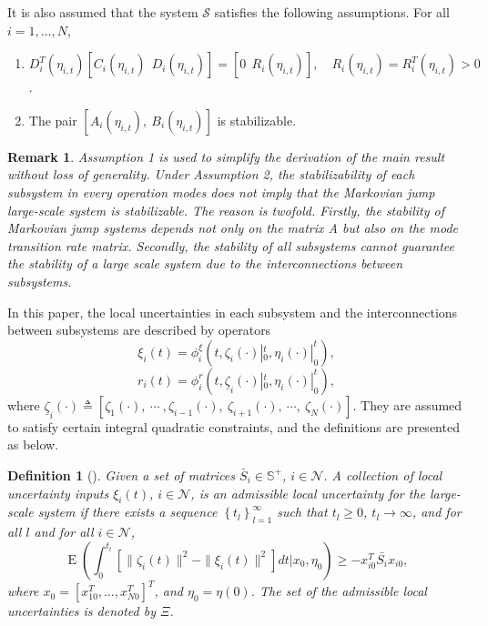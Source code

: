 \documentclass[11pt,draftcls,onecolumn]{IEEEtran}
\DeclareMathOperator{\E}{E}
\newcommand{\set}[1]{\left\{#1\right\}}
\newtheorem{definition}{Definition}
\newtheorem{remark}{Remark}
\begin{document}
It is also assumed that the system $\mathcal{S}$ satisfies the following assumptions. For all $i=1,\ldots, N$,
\begin{enumerate}
\item $D_i^T(\eta_{i,t})[C_i(\eta_{i,t})~~ D_i(\eta_{i,t})]=[0 ~~R_i(\eta_{i,t})], \quad R_i(\eta_{i,t})=R_i^T(\eta_{i,t})>0$.
\item The pair $[A_i(\eta_{i,t}),~B_i(\eta_{i,t})]$ is  stabilizable.
\end{enumerate}
\begin{remark}
Assumption 1 is used to simplify the
derivation of the main result without loss of generality. Under  Assumption 2,  the stabilizability of each subsystem in every operation modes does not imply
that the Markovian jump large-scale system is stabilizable. The reason is twofold. Firstly, the
stability of Markovian jump systems depends not only on the matrix A but also on the mode
transition rate matrix. Secondly, the stability of all subsystems cannot guarantee the stability
of a large scale system due to the interconnections between subsystems.
\end{remark}


In this paper, the local uncertainties in each subsystem and the interconnections between subsystems
 are described by operators
$$\xi_i(t)=\phi_i^{\xi}(t,\zeta_i(\cdot)|_0^t,\eta_i(\cdot)|_0^t),$$
$$r_i(t)=\phi_i^{r}(t,\underline{\zeta}_i(\cdot)|_0^t,\eta_i(\cdot)|_0^t),$$
where $\underline{\zeta}_{i}(\cdot)\triangleq
\left[\zeta_{1}(\cdot),~\cdots~,\zeta_{i-1}(\cdot),~\zeta_{i+1}(\cdot),~\cdots,~\zeta_N(\cdot)\right]$. They
 are assumed to satisfy certain integral quadratic constraints, and the definitions are presented as below.
\begin{definition}[\cite{Xiong2009}] Given a set of matrices $\bar{S}_{i}\in\mathbb{S}^{+}$, $i\in\mathcal{N}$. A
  collection of local uncertainty inputs $\xi_{i}(t)$, $i\in\mathcal{N}$, is an
  admissible local uncertainty for the large-scale system if there exists a
  sequence $\set{t_{l}}_{l=1}^{\infty}$ such that $t_{l}\ge0$, $t_{l}\to\infty$,
  and for all $l$ and for all $i\in\mathcal{N}$,
\label{definition for local uncertainties}
\begin{equation}
\E\left(\int_0^{t_l}\left[\|\zeta_i(t)\|^2-\|\xi_i(t)\|^2\right]dt|x_0,\eta_0\right)\geq -x_{i0}^{T}\bar{S_i}x_{i0},
\end{equation}
  where $x_{0}=[x_{10}^{T},\ldots,x_{N0}^{T}]^{T}$, and $\eta_{0}=\eta(0)$. The set of the admissible local uncertainties is denoted by $\Xi$.
\end{definition}
\end{document}
